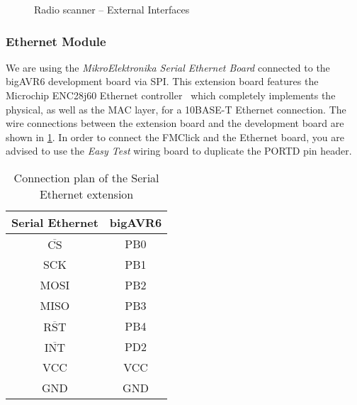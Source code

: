 \documentclass[a4paper,10pt]{article}
\newcommand{\sdcard}[0]{SD Card\xspace}
\newenvironment{note}[1][Note]{%
	\begin{bclogo}[noborder=true,logo=\bcinfo]{#1}
}
{\end{bclogo}}
\newcommand{\TStrut}{\rule{0pt}{2.4ex}}
\begin{document}
\begin{figure}[ht]
	\caption{Radio scanner -- External Interfaces}
	\label{fig:weather_ext_interfaces}

\end{figure}

\subsubsection{Ethernet Module}

We are using the \emph{MikroElektronika Serial Ethernet Board}
	\cite{manual:ethernet} connected to the bigAVR6 development board via SPI.
This extension board features the Microchip ENC28j60 Ethernet
	controller~\cite{datasheet:enc28j60} which completely implements the
	physical, as well as the MAC layer, for a 10BASE-T Ethernet connection.
The wire connections between the extension board and the development board are
	shown in \cref{tab:pinout_serial_ethernet}.
In order to connect the FMClick and the Ethernet board, you are
	advised to use the \textit{Easy Test} wiring board to duplicate the PORTD
	pin header.

\begin{table}[h]
	\centering

	\begin{tabular}{|c|c|}
		\hline
		Serial Ethernet & bigAVR6\\
		\hline
		\TStrut $\overline{\text{CS}}$ & PB0 \\
		SCK      & PB1 \\
		MOSI     & PB2 \\
		MISO     & PB3 \\
		$\overline{\text{RST}}$ & PB4 \\
		$\overline{\text{INT}}$ & PD2 \\
		\hline
		VCC     & VCC \\
		GND    & GND \\
		\hline
	\end{tabular}
	\caption{Connection plan of the Serial Ethernet extension}
	\label{tab:pinout_serial_ethernet}
\end{table}

\end{document}
